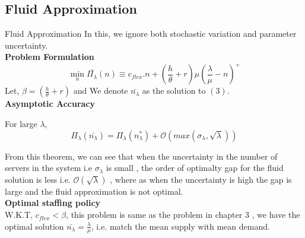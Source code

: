 \documentclass[8pt]{beamer}
\begin{document}
\subsection{Fluid Approximation}
\begin{frame}{Fluid Approximation}
    In this, we ignore both stochastic variation and parameter uncertainty.
   \\  \textbf{Problem Formulation}\\ 
 \begin{equation}
    \min_{n} \bar{{\Pi}_{\lambda}}({n}) \equiv c_{flex}.n+(\frac{h}{\theta}+r)\mu(\frac{\lambda}{\mu}-n)^{+}
\end{equation}
Let, $\beta=(\frac{h}{\theta}+r)$ and We denote $\bar{n_\lambda}$ as the solution to $(3)$.
\\ \medskip \textbf{Asymptotic Accuracy} \\
    \begin{theorem}
For large $\lambda$,
$$\Pi_\lambda(\bar{n_\lambda})=\Pi_\lambda(n_\lambda^{*})+\mathcal{O}(max(\sigma_\lambda,\sqrt{\lambda}))$$
\end{theorem}
From this theorem, we can see that when the uncertainty in the number of servers in the system i.e $\sigma_{\lambda}$ is small , the order of optimalty gap for the fluid solution is less i.e. $\mathcal{O}(\sqrt{\lambda})$ , where as when the uncertainty is high the gap is large and the fluid approximation is not optimal.
\\ \medskip \textbf{Optimal staffing policy} \\
 W.K.T, $c_{flex}<\beta$, this problem is same as the problem in chapter 3 , we have the optimal solution $\bar{n_\lambda}=\frac{\lambda}{\mu}$, i.e. match the mean supply with mean demand.
\end{frame}
\end{document}
